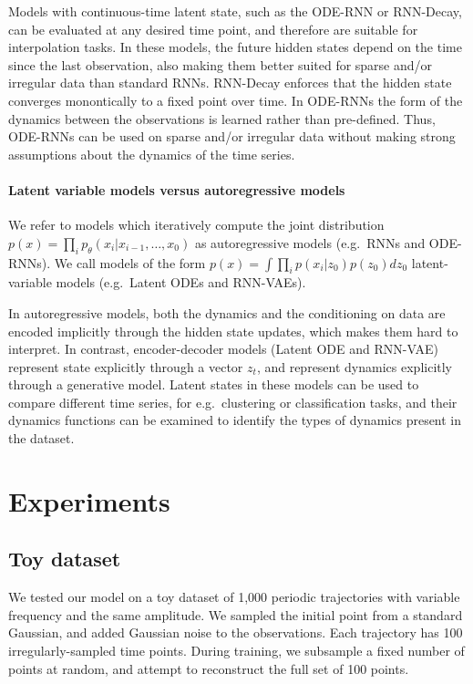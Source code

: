 \documentclass{article}
\begin{document}
Models with continuous-time latent state, such as the ODE-RNN or RNN-Decay, can be evaluated at any desired time point, and therefore are suitable for interpolation tasks.
In these models, the future hidden states depend on the time since the last observation, also making them better suited for sparse and/or irregular data than standard RNNs.
RNN-Decay enforces that the hidden state converges monontically to a fixed point over time.
In ODE-RNNs the form of the dynamics between the observations is learned rather than pre-defined.
Thus, ODE-RNNs can be used on sparse and/or irregular data without making strong assumptions about the dynamics of the time series.

\paragraph{Latent variable models versus autoregressive models}
We refer to models which iteratively compute the joint distribution ${p(x) = \prod_i p_\theta(x_i|x_{i-1}, \dots, x_0)}$ as autoregressive models (e.g.\ RNNs and ODE-RNNs).
We call models of the form ${p(x) = \int \prod_i p(x_i| z_0) p(z_0) dz_0}$ latent-variable models (e.g.\ Latent ODEs and RNN-VAEs). 

In autoregressive models, both the dynamics and the conditioning on data are encoded implicitly through the hidden state updates, which makes them hard to interpret.
In contrast, encoder-decoder models (Latent ODE and RNN-VAE) represent state explicitly through a vector $z_t$, and represent dynamics explicitly through a generative model. Latent states in these models can be used to compare different time series, for e.g.\ clustering or classification tasks, and their dynamics functions can be examined to identify the types of dynamics present in the dataset.


\section{Experiments}

\subsection{Toy dataset}
We tested our model on a toy dataset of 1,000 periodic trajectories with variable frequency and the same amplitude.
We sampled the initial point from a standard Gaussian, and added Gaussian noise to the observations. 
Each trajectory has 100 irregularly-sampled time points.
During training, we subsample a fixed number of points at random, and attempt to reconstruct the full set of 100 points.
\end{document}
